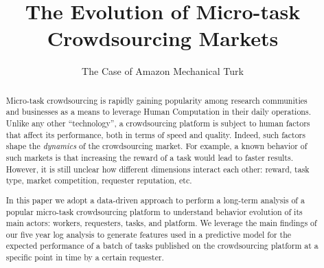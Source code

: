 \documentclass{sig-alternate}
\begin{document}
%

\title{The Evolution of Micro-task Crowdsourcing Markets}
\subtitle{The Case of Amazon Mechanical Turk}


\author{}

\maketitle
\begin{abstract}
Micro-task crowdsourcing is rapidly gaining popularity among research communities and businesses as a means to leverage Human Computation in their daily operations. Unlike any other ``technology'', a crowdsourcing platform is subject to human factors that affect its performance, both in terms of speed and quality. Indeed, such factors shape the \emph{dynamics} of the crowdsourcing market. For example, a known behavior of such markets is that increasing the reward of a task would lead to faster results. However, it is still unclear how different dimensions interact each other: reward, task type, market competition, requester reputation, etc.

In this paper we adopt a data-driven approach to perform a long-term analysis of a popular micro-task crowdsourcing platform to understand behavior evolution of its main actors: workers, requesters, tasks, and platform. We leverage the main findings of our five year log analysis to generate features used in a predictive model for the expected performance of a batch of tasks published on the crowdsourcing platform at a specific point in time by a certain requester.
\end{abstract}

\end{document}
